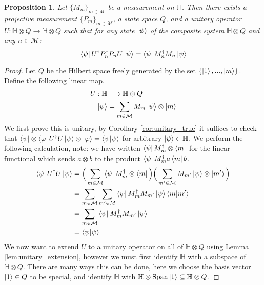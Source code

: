 \documentclass[12pt]{article}
\theoremstyle{plain}
\newtheorem{proposition}[thm]{Proposition}
\theoremstyle{definition}
\newcommand{\bb}[1]{\mathbb{#1}}
\newcommand{\call}[1]{\mathcal{#1}}
\newcommand{\lto}{\longrightarrow}
\begin{document}
	\begin{proposition}\label{prop:projective_vs_measurement}
		Let $\lbrace M_m\rbrace_{m \in \call{M}}$ be a measurement on $\bb{H}$. Then there exists a projective measurement $\{ P_m \}_{m \in \call{M}}$, a state space $Q$, and a unitary operator $U: \bb{H} \otimes Q \lto \bb{H} \otimes Q$ such that for any state $\ket{\psi}$ of the composite system $\bb{H} \otimes Q$ and any $n \in \call{M}$:
		\begin{equation}
			\bra{\psi} U^\dagger P_n^\dagger P_n U\ket{\psi} = \bra{\psi} M_n^\dagger M_n \ket{\psi}
			\end{equation}
	\end{proposition}
	\begin{proof}
		Let $Q$ be the Hilbert space freely generated by the set $\lbrace \ket{1},...,\ket{m}\rbrace$. Define the following linear map.
		\begin{align}
			\label{eq:measurement}U: \bb{H} &\lto \bb{H} \otimes Q\\
			\label{eq:measurement_equation}\ket{\psi} &= \sum_{m \in \call{M}}M_m\ket{\psi}\otimes \ket{m}
		\end{align}
		We first prove this is unitary, by Corollary \ref{cor:unitary_true} it suffices to check that $\bra{\psi}\otimes \bra{\varphi}U^\dagger U\ket{\psi}\otimes\ket{\varphi} = \bra{\psi}\ket{\psi}$ for arbitrary $\ket{\psi} \in \bb{H}$. We perform the following calculation, note: we have written $\bra{\psi} M_m^\dagger \otimes \bra{m}$ for the linear functional which sends $a \otimes b$ to the product $\bra{\psi} M_m^\dagger a \bra{m}b$.
		\begin{align*}
			\bra{\psi}U^\dagger U\ket{\psi} &= \Big(\sum_{m \in \call{M}}\bra{\psi}M_m^\dagger \otimes \bra{m}\Big)\Big(\sum_{m' \in \call{M}}M_{m'}\ket{\psi} \otimes \ket{m'}\Big)\\
			&= \sum_{m \in \call{M}}\sum_{m' \in M}\bra{\psi}M_m^\dagger M_{m'}\ket{\psi}\bra{m}\ket{m'}\\
			&= \sum_{m \in \call{M}}\bra{\psi}M_m^\dagger M_{m'}\ket{\psi}\\
			&= \bra{\psi}\ket{\psi}
		\end{align*}
		We now want to extend $U$ to a unitary operator on all of $\bb{H} \otimes Q$ using Lemma \ref{lem:unitary_extension}, however we must first identify $\bb{H}$ with a subspace of $\bb{H} \otimes Q$. There are many ways this can be done, here we choose the basis vector $\ket{1} \in Q$ to be special, and identify $\bb{H}$ with $\bb{H} \otimes \operatorname{Span}\ket{1} \subseteq \bb{H} \otimes Q$.
		

\end{proof}
\end{document}

